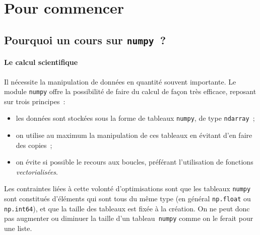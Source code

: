 \documentclass[10pt,fleqn]{article} %
\begin{document}


\def\columnseprulecolor{\color{ocre}}
\setlength{\columnseprule}{0.4pt} 

\section{Pour commencer}

\subsection{Pourquoi un cours sur \texttt{numpy}~?}

\paragraph{Le calcul scientifique} Il nécessite la manipulation de données en
quantité souvent importante. Le module \texttt{numpy} offre la
possibilité de faire du calcul de façon très efficace, reposant sur
trois principes~:

\begin{itemize}
\item 
  les données sont stockées sous la forme de tableaux \texttt{numpy},
  de type \texttt{ndarray}~;

\item 
  on utilise au maximum la manipulation de ces tableaux en évitant
  d'en faire des copies~;

\item 
  on évite si possible le recours aux boucles, préférant l'utilisation
  de fonctions \emph{vectorialisées}.
\end{itemize}

Les contraintes liées à cette volonté d'optimisations sont que les
tableaux \texttt{numpy} sont constitués d'éléments qui sont tous du
même type (en général \texttt{np.float} ou \texttt{np.int64}), et que
la taille des tableaux est fixée à la création. On ne peut donc pas
augmenter ou diminuer la taille d'un tableau~\texttt{numpy} comme on
le ferait pour une liste.

\end{document}
